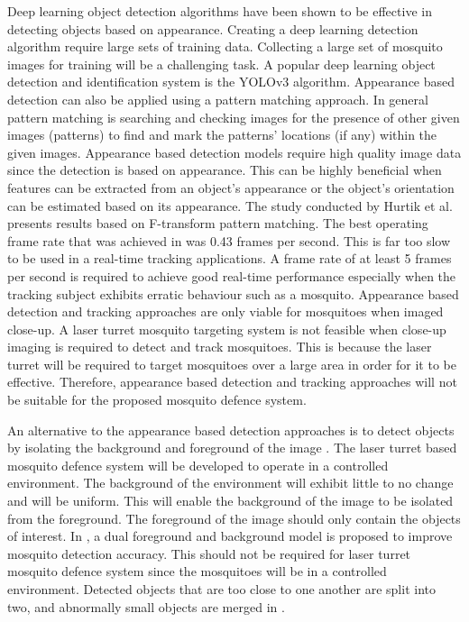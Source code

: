 Deep learning object detection algorithms have been shown to be effective in detecting objects based on appearance. Creating a deep learning detection algorithm require large sets of training data. Collecting a large set of mosquito images for training will be a challenging task. A popular deep learning object detection and identification system is the YOLOv3 algorithm. Appearance based detection can also be applied using a pattern matching approach. In general pattern matching is searching and checking images for the presence of other given images (patterns) to find and mark the patterns' locations (if any) within the given images. Appearance based detection models require high quality image data since the detection is based on appearance. This can be highly beneficial when features can be extracted from an object's appearance or the object's orientation can be estimated based on its appearance. The study conducted by Hurtik et al. \cite{Hurtik2018} presents results based on F-transform pattern matching. The best operating frame rate that was achieved in \cite{Hurtik2018} was 0.43 frames per second. This is far too slow to be used in a real-time tracking applications. A frame rate of at least 5 frames per second is required to achieve good real-time performance especially when the tracking subject exhibits erratic behaviour such as a mosquito. Appearance based detection and tracking approaches are only viable for mosquitoes when imaged close-up. A laser turret mosquito targeting system is not feasible when close-up imaging is required to detect and track mosquitoes. This is because the laser turret will be required to target mosquitoes over a large area in order for it to be effective. Therefore, appearance based detection and tracking approaches will not be suitable for the proposed mosquito defence system.

An alternative to the appearance based detection approaches is to detect objects by isolating the background and foreground of the image \cite{Liang2016}. The laser turret based mosquito defence system will be developed to operate in a controlled environment. The background of the environment will exhibit little to no change and will be uniform. This will enable the background of the image to be isolated from the foreground. The foreground of the image should only contain the objects of interest. In \cite{Bao2018}, a dual foreground and background model is proposed to improve mosquito detection accuracy. This should not be required for laser turret mosquito defence system since the mosquitoes will be in a controlled environment. Detected objects that are too close to one another are split into two, and abnormally small objects are merged in \cite{Bao2018}.

